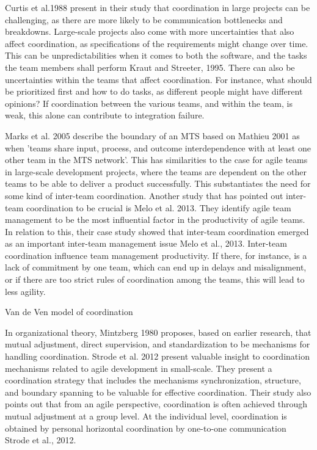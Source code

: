 Curtis et al.1988 present in their study that coordination in large projects can be challenging, as there are more likely to be communication bottlenecks and breakdowns. Large-scale projects also come with more uncertainties that also affect coordination, as specifications of the requirements might change over time. This can be unpredictabilities when it comes to both the software, and the tasks the team members shall perform Kraut and Streeter, 1995. There can also be uncertainties within the teams that affect coordination. For instance, what should be prioritized first and how to do tasks, as different people might have different opinions? If coordination between the various teams, and within the team, is weak, this alone can contribute to integration failure.

Marks et al. 2005 describe the boundary of an MTS based on Mathieu 2001 as when ’teams share input, process, and outcome interdependence with at least one other team in the MTS network’. This has similarities to the case for agile teams in large-scale development projects, where the teams are dependent on the other teams to be able to deliver a product successfully. This substantiates the need for some kind of inter-team coordination. Another study that has pointed out inter-team coordination to be crucial is Melo et al. 2013. They identify agile team management to be the most influential factor in the productivity of agile teams. In relation to this, their case study showed that inter-team coordination emerged as an important inter-team management issue Melo et al., 2013. Inter-team coordination influence team management productivity. If there, for instance, is a lack of commitment by one team, which can end up in delays and misalignment, or if there are too strict rules of coordination among the teams, this will lead to less agility.

Van de Ven model of coordination

In organizational theory, Mintzberg 1980 proposes, based on earlier research, that mutual adjustment, direct supervision, and standardization to be mechanisms for handling coordination. Strode et al. 2012 present valuable insight to coordination mechanisms related to agile development in small-scale. They present a coordination strategy that includes the mechanisms synchronization, structure, and boundary spanning to be valuable for effective coordination. Their study also points out that from an agile perspective, coordination is often achieved through mutual adjustment at a group level. At the individual level, coordination is obtained by personal horizontal coordination by one-to-one communication Strode et al., 2012.

